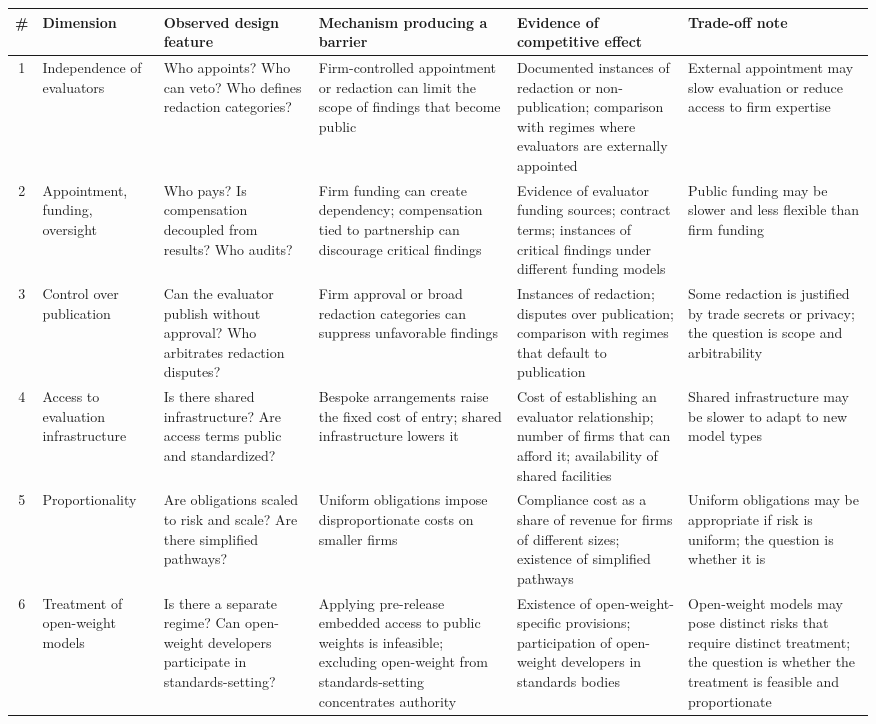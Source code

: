 \begin{table}[H]
\centering
\small
\begin{tabularx}{\textwidth}{@{}c l X X X X@{}}
\toprule
\# & Dimension & Observed design feature & Mechanism producing a barrier & Evidence of competitive effect & Trade-off note \\
\midrule
1 & Independence of evaluators & Who appoints? Who can veto? Who defines redaction categories? & Firm-controlled appointment or redaction can limit the scope of findings that become public & Documented instances of redaction or non-publication; comparison with regimes where evaluators are externally appointed & External appointment may slow evaluation or reduce access to firm expertise \\
2 & Appointment, funding, oversight & Who pays? Is compensation decoupled from results? Who audits? & Firm funding can create dependency; compensation tied to partnership can discourage critical findings & Evidence of evaluator funding sources; contract terms; instances of critical findings under different funding models & Public funding may be slower and less flexible than firm funding \\
3 & Control over publication & Can the evaluator publish without approval? Who arbitrates redaction disputes? & Firm approval or broad redaction categories can suppress unfavorable findings & Instances of redaction; disputes over publication; comparison with regimes that default to publication & Some redaction is justified by trade secrets or privacy; the question is scope and arbitrability \\
4 & Access to evaluation infrastructure & Is there shared infrastructure? Are access terms public and standardized? & Bespoke arrangements raise the fixed cost of entry; shared infrastructure lowers it & Cost of establishing an evaluator relationship; number of firms that can afford it; availability of shared facilities & Shared infrastructure may be slower to adapt to new model types \\
5 & Proportionality & Are obligations scaled to risk and scale? Are there simplified pathways? & Uniform obligations impose disproportionate costs on smaller firms & Compliance cost as a share of revenue for firms of different sizes; existence of simplified pathways & Uniform obligations may be appropriate if risk is uniform; the question is whether it is \\
6 & Treatment of open-weight models & Is there a separate regime? Can open-weight developers participate in standards-setting? & Applying pre-release embedded access to public weights is infeasible; excluding open-weight from standards-setting concentrates authority & Existence of open-weight-specific provisions; participation of open-weight developers in standards bodies & Open-weight models may pose distinct risks that require distinct treatment; the question is whether the treatment is feasible and proportionate \\

\end{tabularx}
\end{table}
